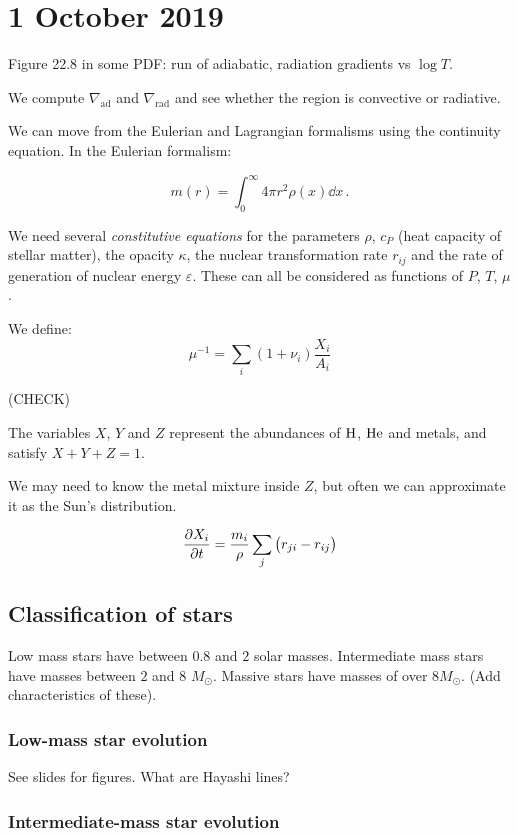 \documentclass[main.tex]{subfiles}
\begin{document}
\section*{1 October 2019}

Figure 22.8 in some PDF: run of adiabatic, radiation gradients vs \(\log T \).

We compute \(\nabla_{\text{ad}}\) and \(\nabla_{\text{rad}}\) and see whether the region is convective or radiative.

We can move from the Eulerian and Lagrangian formalisms using the continuity equation. In the Eulerian formalism:

\begin{equation}
  m(r) = \int_0^\infty 4 \pi r^2 \rho(x) \dd{x} \,.
\end{equation}

We need several \emph{constitutive equations} for the parameters \(\rho\), \(c_P\) (heat capacity of stellar matter), the opacity \(\kappa\), the nuclear transformation rate \(r_{ij}\) and the rate of generation of nuclear energy \(\varepsilon\). These can all be considered as functions of \(P\), \(T\), \(\mu\).

We define:
%
\begin{equation}
  \mu^{-1} = \sum _{i}  (1 + \nu_i) \frac{X_i}{A_i}
\end{equation}

(CHECK)

The variables \(X\), \(Y\) and \(Z\) represent the abundances of \(\ce{H}\), \(\ce{He}\) and metals, and satisfy \(X+Y+Z=1\).

We may need to know the metal mixture inside \(Z\), but often we can approximate it as the Sun's distribution.

\begin{equation}
  \pdv{X_i}{t} = \frac{m_i}{\rho} \sum _j \qty( r_{ji} - r_{ij})
\end{equation}

\subsection{Classification of stars}

Low mass stars have between \(0.8\) and \(2\) solar masses.
Intermediate mass stars have masses between \(2\) and \(8\) \(M_{\odot}\).
Massive stars have masses of over \(8 M_{\odot}\).
(Add characteristics of these).

\subsubsection{Low-mass star evolution}

See slides for figures. What are Hayashi lines?

\subsubsection{Intermediate-mass star evolution}
\end{document}
